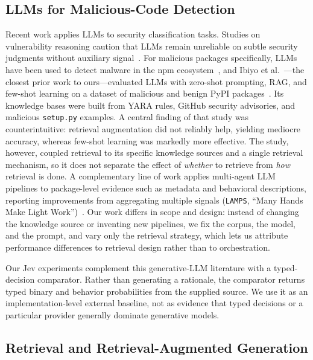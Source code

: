 \subsection{LLMs for Malicious-Code Detection}
\label{sec:llm-detection}

Recent work applies LLMs to security classification tasks. Studies on
vulnerability reasoning caution that LLMs remain unreliable on subtle
security judgments without auxiliary signal~\cite{ullah2024llmsec}. For
malicious packages specifically, LLMs have been used to detect malware in
the npm ecosystem~\cite{zahan2024npm}, and Ibiyo et al.~\cite{ease2025rag}---the closest
prior work to ours---evaluated LLMs with zero-shot prompting, RAG, and
few-shot learning on a dataset of malicious and benign PyPI
packages~\cite{ease2025rag}. Its knowledge bases were built from YARA rules,
GitHub security advisories, and malicious \texttt{setup.py} examples. A
central finding of that study was counterintuitive: retrieval augmentation
did not reliably help, yielding mediocre accuracy, whereas few-shot learning
was markedly more effective. The study, however, coupled retrieval to its
specific knowledge sources and a single retrieval mechanism, so it does not
separate the effect of \emph{whether} to retrieve from \emph{how} retrieval
is done.
A complementary line of work applies multi-agent LLM pipelines to
package-level evidence such as metadata and behavioral descriptions,
reporting improvements from aggregating multiple signals (\texttt{LAMPS},
``Many Hands Make Light Work'')~\cite{lamps2026}. Our work differs in scope
and design: instead of changing the knowledge source or inventing new
pipelines, we fix the corpus, the model, and the prompt, and vary only the
retrieval strategy, which lets us attribute performance differences to
retrieval design rather than to orchestration.

Our Jev experiments complement this generative-LLM literature with a
typed-decision comparator. Rather than generating a rationale, the comparator
returns typed binary and behavior probabilities from the supplied source. We
use it as an implementation-level external baseline, not as evidence that
typed decisions or a particular provider generally dominate generative models.

\subsection{Retrieval and Retrieval-Augmented Generation}
\label{sec:rag}

